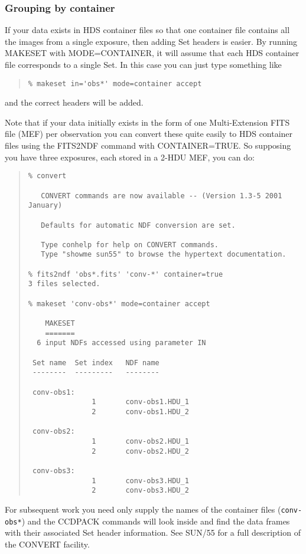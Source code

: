 \documentclass[twoside,11pt]{article}
\newcommand{\latexhtml}[2]{#1}
\newcommand{\xref}[3]{#1}
\renewcommand{\_}{\texttt{\symbol{95}}}
\newcommand{\ttsize}{\latexhtml{\small}{}}
\newenvironment{myquote}{\begin{quote}\ttsize}{\end{quote}}
\newcommand{\text}[1]{{\ttsize \tt #1}}
\newcommand{\routine}[1]{{\sc #1}}
\begin{document}
\subsubsection{\label{makeset_container}Grouping by container}

If your data exists in HDS container files 
so that one container file contains all the images from a single 
exposure, then adding Set headers is easier.
By running \routine{MAKESET} 
with MODE=CONTAINER,
it will assume that each HDS container file corresponds to a single Set.
In this case you can just type something like
\begin{myquote}
\begin{verbatim}
% makeset in='obs*' mode=container accept
\end{verbatim}
\end{myquote}
and the correct headers will be added.

Note that if your data initially exists in the form of one 
Multi-Extension FITS file (MEF) per observation 
you can convert these quite easily to
HDS container files using the \xref{FITS2NDF}{sun55}{FITS2NDF} command
with CONTAINER=TRUE.  So supposing you have three exposures,
each stored in a 2-HDU MEF, you can do:
\begin{myquote}
\begin{verbatim}
% convert

   CONVERT commands are now available -- (Version 1.3-5 2001 January)

   Defaults for automatic NDF conversion are set.

   Type conhelp for help on CONVERT commands.
   Type "showme sun55" to browse the hypertext documentation.

% fits2ndf 'obs*.fits' 'conv-*' container=true
3 files selected.

% makeset 'conv-obs*' mode=container accept

    MAKESET
    =======
  6 input NDFs accessed using parameter IN

 Set name  Set index   NDF name
 --------  ---------   --------

 conv-obs1:
               1       conv-obs1.HDU_1
               2       conv-obs1.HDU_2

 conv-obs2:
               1       conv-obs2.HDU_1
               2       conv-obs2.HDU_2

 conv-obs3:
               1       conv-obs3.HDU_1
               2       conv-obs3.HDU_2
\end{verbatim}
\end{myquote}
For subsequent work you need only
supply the names of the container files (\text{conv-obs*})
and the CCDPACK commands will look inside and find the 
data frames with their 
associated Set header information.
See \xref{SUN/55}{sun55}{} for a full description of the CONVERT
facility.
\end{document}
